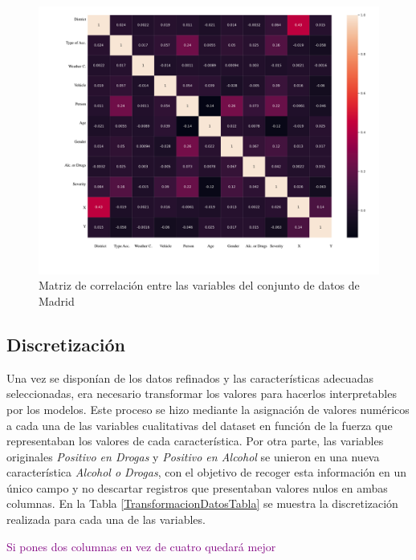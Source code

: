 \begin{figure}[H]
	\centering
	\includegraphics[width=12cm]{Figures/1stPaper/CorrelationMatrix.png}
	\caption{Matriz de correlación entre las variables del conjunto de datos de Madrid}
	\label{CorrelationMatrix}
\end{figure}


\subsection*{Discretización}

Una vez se disponían de los datos refinados y las características adecuadas seleccionadas, era necesario transformar los valores para hacerlos interpretables por los modelos. Este proceso se hizo mediante la asignación de valores numéricos a cada una de las variables cualitativas del dataset en función de la fuerza que representaban los valores de cada característica. Por otra parte, las variables originales \textit{Positivo en Drogas} y \textit{Positivo en Alcohol} se unieron en una nueva característica \textit{Alcohol o Drogas}, con el objetivo de recoger esta información en un único campo y no descartar registros que presentaban valores nulos en ambas columnas. En la Tabla \ref{TransformacionDatosTabla} se muestra la discretización realizada para cada una de las variables.

\textcolor{purple}{Si pones dos columnas en vez de cuatro quedará mejor}

